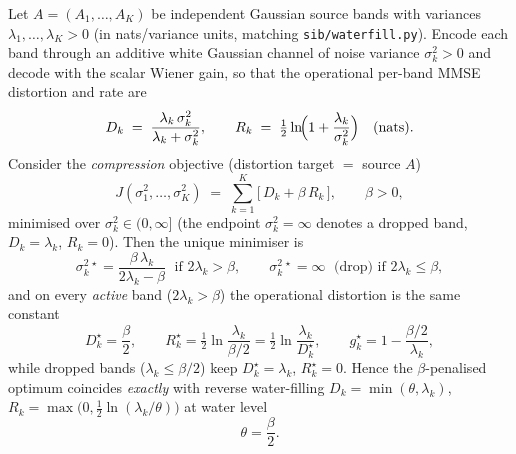 \begin{theorem}[The $\beta$-penalised Gaussian channel is exactly reverse water-filling at level $\theta=\beta/2$]
\label{thm:beta-waterfill}
Let $A=(A_1,\dots,A_K)$ be independent Gaussian source bands with variances
$\lambda_1,\dots,\lambda_K>0$ (in nats/variance units, matching
\texttt{sib/waterfill.py}). Encode each band through an additive white Gaussian
channel of noise variance $\sigma_k^2>0$ and decode with the scalar Wiener gain,
so that the operational per-band MMSE distortion and rate are
\begin{equation}
D_k \;=\; \frac{\lambda_k\,\sigma_k^2}{\lambda_k+\sigma_k^2},
\qquad
R_k \;=\; \tfrac12\ln\!\Bigl(1+\frac{\lambda_k}{\sigma_k^2}\Bigr)
\quad\text{(nats).}
\label{eq:DR}
\end{equation}
Consider the \emph{compression} objective (distortion target $=$ source $A$)
\begin{equation}
J(\sigma_1^2,\dots,\sigma_K^2)
\;=\;\sum_{k=1}^{K}\bigl[\,D_k+\beta\,R_k\,\bigr],
\qquad \beta>0,
\label{eq:obj}
\end{equation}
minimised over $\sigma_k^2\in(0,\infty]$ (the endpoint $\sigma_k^2=\infty$
denotes a dropped band, $D_k=\lambda_k$, $R_k=0$). Then the unique minimiser is
\begin{equation}
\boxed{\;\sigma_k^{2\,\star}=\dfrac{\beta\,\lambda_k}{2\lambda_k-\beta}\;\text{ if }2\lambda_k>\beta,
\qquad
\sigma_k^{2\,\star}=\infty\;\text{ (drop) if }2\lambda_k\le\beta,\;}
\label{eq:sigma-star}
\end{equation}
and on every \emph{active} band ($2\lambda_k>\beta$) the operational distortion is
the same constant
\begin{equation}
D_k^\star=\frac{\beta}{2},
\qquad
R_k^\star=\tfrac12\ln\!\frac{\lambda_k}{\beta/2}
=\tfrac12\ln\!\frac{\lambda_k}{D_k^\star},
\qquad
g_k^\star=1-\frac{\beta/2}{\lambda_k},
\label{eq:Dstar}
\end{equation}
while dropped bands ($\lambda_k\le\beta/2$) keep $D_k^\star=\lambda_k$, $R_k^\star=0$.
Hence the $\beta$-penalised optimum coincides \emph{exactly} with reverse
water-filling $D_k=\min(\theta,\lambda_k)$, $R_k=\max\!\bigl(0,\tfrac12\ln(\lambda_k/\theta)\bigr)$
at water level
\begin{equation}
\theta=\frac{\beta}{2}.
\end{equation}
\end{theorem}

